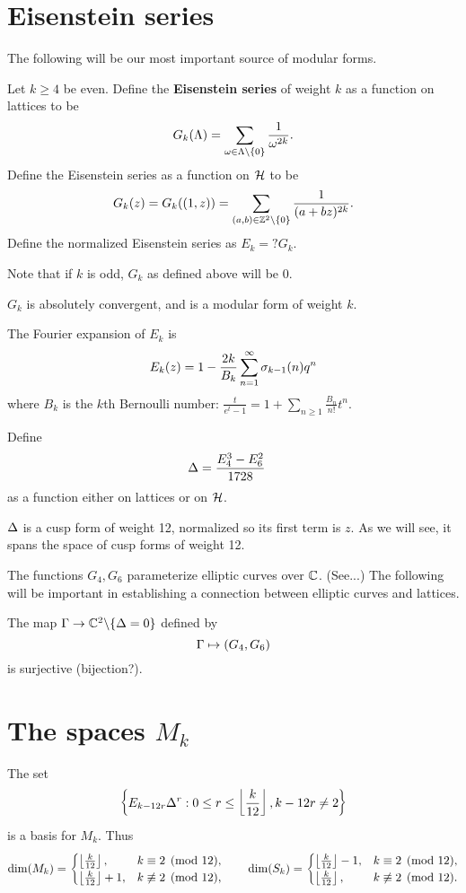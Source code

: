 \section{Eisenstein series}
The following will be our most important source of modular forms.
\begin{df}
Let $k\ge 4$ be even. 
Define the \textbf{Eisenstein series} of weight $k$ as a function on lattices to be 
\[
G_{k}(\La)=\sum_{\om \in \La\bs\{0\}} \rc{\om^{2k}}.
\]
Define the Eisenstein series as a function on $\cal H$ to be
\[
G_k(z)=G_k((1,z))=\sum_{(a,b)\in \Z^2\bs \{0\}} \rc{(a+bz)^{2k}}.
\]
Define the normalized Eisenstein series as $E_k=?G_k$. 
\end{df}
Note that if $k$ is odd, $G_k$ as defined above will be 0.
\begin{pr}
$G_k$ is absolutely convergent, and is a modular form of weight $k$.
\end{pr}
\begin{thm}
The Fourier expansion of $E_k$ is
\[
E_k(z)=1-\frac{2k}{B_k}\sum_{n=1}^{\iy} \si_{k-1}(n)q^n
\]
where $B_k$ is the $k$th Bernoulli number: $\frac{t}{e^t-1}=1+\sum_{n\ge 1}\frac{B_n}{n!}t^n$.
\end{thm}
\begin{df}
Define 
\begin{align*}
\De&=\frac{E_4^3-E_6^2}{1728}
\end{align*}
as a function either on lattices or on $\cal H$.
\end{df}
$\De$ is a cusp form of weight 12, normalized so its first term is $z$. As we will see, it spans the space of cusp forms of weight 12.

The functions $G_4,G_6$ parameterize elliptic curves over $\C$. (See...) The following will be important in establishing a connection between elliptic curves and lattices.
\begin{thm}
The map $\Ga\to \C^2\bs\{\De=0\}$ defined by
\[
\Ga\mapsto (G_4,G_6)
\]
is surjective (bijection?).
\end{thm}
\section{The spaces $M_k$}
\begin{thm}
The set
\[
\set{E_{k-12r}\De^r}{0\le r\le \fl{\frac{k}{12}}, k-12r\ne 2}
\]
is a basis for $M_k$. Thus
\[
\dim(M_k)=
\begin{cases}
\fl{\frac{k}{12}},&k\equiv 2\pmod{12},\\
\fl{\frac{k}{12}}+1,&k\nequiv 2\pmod{12},
\end{cases}
\qquad
\dim(S_k)=
\begin{cases}
\fl{\frac{k}{12}}-1,&k\equiv 2\pmod{12},\\
\fl{\frac{k}{12}},&k\nequiv 2\pmod{12}.
\end{cases}
\]
\end{thm}

